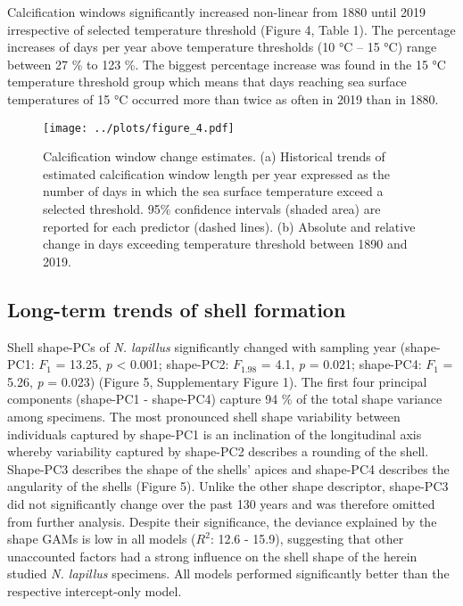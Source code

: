 \documentclass[smallextended]{svjour3}       %
\begin{document}
Calcification windows significantly increased non-linear from 1880 until
2019 irrespective of selected temperature threshold (Figure 4, Table 1).
The percentage increases of days per year above temperature thresholds
(10 °C -- 15 °C) range between 27 \% to 123 \%. The biggest percentage
increase was found in the 15 °C temperature threshold group which means
that days reaching sea surface temperatures of 15 °C occurred more than
twice as often in 2019 than in 1880.

\begin{figure}
\centering
\texttt{[image: ../plots/figure\_4.pdf]}
\caption{Calcification window change estimates. (a) Historical trends of
estimated calcification window length per year expressed as the number
of days in which the sea surface temperature exceed a selected
threshold. 95\% confidence intervals (shaded area) are reported for each
predictor (dashed lines). (b) Absolute and relative change in days
exceeding temperature threshold between 1890 and 2019.}
\end{figure}

\hypertarget{long-term-trends-of-shell-formation}{%
\subsection{Long-term trends of shell
formation}\label{long-term-trends-of-shell-formation}}

Shell shape-PCs of \emph{N. lapillus} significantly changed with
sampling year (shape-PC1: \(F_{1}\) = 13.25, \emph{p} \textless{} 0.001;
shape-PC2: \(F_{1.98}\) = 4.1, \emph{p} = 0.021; shape-PC4: \(F_{1}\) =
5.26, \emph{p} = 0.023) (Figure 5, Supplementary Figure 1). The first
four principal components (shape-PC1 - shape-PC4) capture 94 \% of the
total shape variance among specimens. The most pronounced shell shape
variability between individuals captured by shape-PC1 is an inclination
of the longitudinal axis whereby variability captured by shape-PC2
describes a rounding of the shell. Shape-PC3 describes the shape of the
shells' apices and shape-PC4 describes the angularity of the shells
(Figure 5). Unlike the other shape descriptor, shape-PC3 did not
significantly change over the past 130 years and was therefore omitted
from further analysis. Despite their significance, the deviance
explained by the shape GAMs is low in all models (\(R^2\): 12.6 - 15.9),
suggesting that other unaccounted factors had a strong influence on the
shell shape of the herein studied \emph{N. lapillus} specimens. All
models performed significantly better than the respective intercept-only
model.
\end{document}
